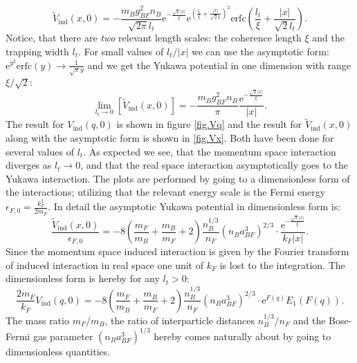 \begin{equation}
\tilde{V}_{\text{ind}}(x,0) = -\frac{m_Bg_{BF}^2n_B}{\sqrt{2\pi} l_t} \text{e}^{-\frac{\sqrt{2}|x|}{\xi}}\text{e}^{\left(\frac{l_t}{\xi}+\frac{|x|}{\sqrt{2}l_t}\right)^2}\text{erfc}\left(\frac{l_t}{\xi}+\frac{|x|}{\sqrt{2}l_t}\right).
\label{eq.VFFx_exact}
\end{equation}
Notice, that there are \textit{two} relevant length scales: the coherence length $\xi$ and the trapping width $l_t$. For small values of $l_t/|x|$ we can use the asymptotic form: $\text{e}^{y^2}\text{erfc}(y) \to \frac{1}{\sqrt{\pi}y}$ and we get the Yukawa potential in one dimension with range $\xi/\sqrt{2}$: 
\begin{equation}
\lim_{l_t\to 0} \left[ \tilde{V}_{\text{ind}}(x,0) \right] = -\frac{m_Bg_{BF}^2n_B}{\pi}\frac{\text{e}^{-\frac{\sqrt{2}|x|}{\xi}}}{|x|}.
\label{eq.Vx_lt=0}
\end{equation}
The result for $V_{\text{ind}}(q,0)$ is shown in figure \ref{fig.Vq} and the result for $\tilde{V}_{\text{ind}}(x,0)$ along with the asymptotic form is shown in \ref{fig.Vx}. Both have been done for several values of $l_t$. As expected we see, that the momentum space interaction diverges as $l_t \to 0$, and that the real space interaction asymptotically goes to the Yukawa interaction. The plots are performed by going to a dimensionless form of the interactions; utilizing that the relevant energy scale is the Fermi energy $\epsilon_{F,0} = \frac{k_F^2}{2m_F}$. In detail the asymptotic Yukawa potential in dimensionless form is:
\begin{equation}
\frac{\tilde{V}_{\text{ind}}(x,0)}{\epsilon_{F,0}} = - 8\left( \frac{m_F}{m_B} + \frac{m_B}{m_F} + 2 \right) \frac{n_B^{1/3}}{n_F}(n_Ba_{BF}^3)^{2/3} \cdot \frac{\text{e}^{ -\frac{ \sqrt{2}|x|}{\xi} } }{k_F|x|}.
\label{eq.Vxdimensionless}
\end{equation}
Since the momentum space induced interaction is given by the Fourier transform of induced interaction in real space one unit of $k_F$ is lost to the integration. The dimensionless form is hereby for any $l_t > 0$: 
\begin{equation}
\frac{2m_F}{k_F}V_{\text{ind}}(q,0) = - 8\left( \frac{m_F}{m_B} + \frac{m_B}{m_F} + 2 \right) \frac{n_B^{1/3}}{n_F}(n_Ba_{BF}^3)^{2/3} \cdot \text{e}^{F(q)} E_1(F(q)).
\label{eq.Vqdimensionless}
\end{equation}
The mass ratio $m_F/m_B$, the ratio of interparticle distances $n_B^{1/3}/n_F$ and the Bose-Fermi gas parameter $(n_Ba_{BF}^3)^{1/3}$ hereby comes naturally about by going to dimensionless quantities. 

